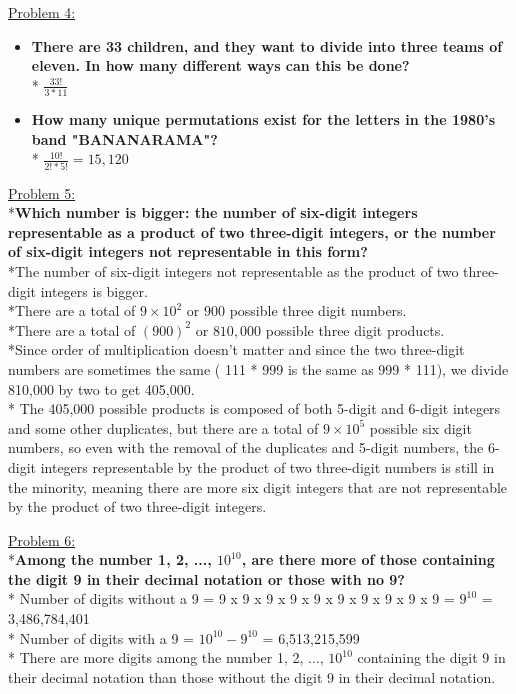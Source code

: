 \documentclass[12pt]{article}
\begin{document}
\noindent
\uline{Problem 4:}
\begin{itemize}
\item\textbf{There are 33 children, and they want to divide into three teams of eleven. In how many different ways can this be done?}
\\* $\frac{33!}{3 * 11}$
\item\textbf{How many unique permutations exist for the letters in the 1980's band "BANANARAMA"?}
\\* $\frac{10!}{2! * 5!} = 15,120$
\end{itemize}
\bigskip

\noindent
\uline{Problem 5:}
\\*\textbf{Which number is bigger: the number of six-digit integers representable as a product of two three-digit integers, or the number of six-digit integers not representable in this form?}
\\*The number of six-digit integers not representable as the product of two three-digit integers is bigger.
\\*There are a total of $9 \times 10^2$ or $900$ possible three digit numbers.
\\*There are a total of $(900)^2$ or $810,000$ possible three digit products.
\\*Since order of multiplication doesn't matter and since the two three-digit numbers are sometimes the same ( 111 * 999 is the same as 999 * 111), we divide 810,000 by two to get 405,000.
\\* The 405,000 possible products is composed of both 5-digit and 6-digit integers and some other duplicates, but there are a total of $9 \times 10^5$ possible six digit numbers, so even with the removal of the duplicates and 5-digit numbers, the 6-digit integers representable by the product of two three-digit numbers is still in the minority, meaning there are more six digit integers that are not representable by the product of two three-digit integers.
\bigskip

\noindent
\uline{Problem 6:}
\\*\textbf{Among the number 1, 2, ..., $10^{10}$, are there more of those containing the digit 9 in their decimal notation or those with no 9?}
\medskip
\\* Number of digits without a 9 = 9 x 9 x 9 x 9 x 9 x 9 x 9 x 9 x 9 x 9 = $9^{10}$ = 3,486,784,401
\\* Number of digits with a 9 = $10^{10} - 9^{10}$ = 6,513,215,599
\\* There are more digits among the number 1, 2, ..., $10^{10}$ containing the digit 9 in their decimal notation than those without the digit 9 in their decimal notation.
\bigskip
\end{document}
